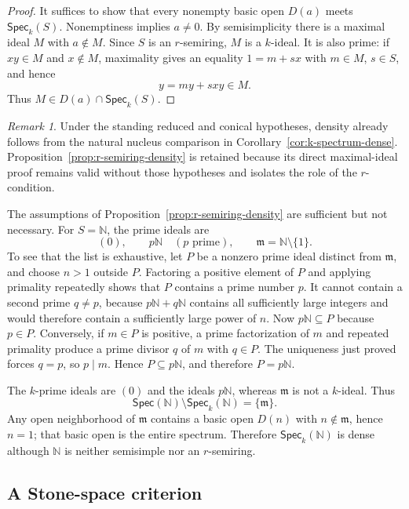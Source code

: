 \documentclass[12pt,leqno]{amsart}
\newcommand{\Spec}{\mathsf{Spec}}
\newcommand{\Speck}{\mathsf{Spec}_{k}}
\theoremstyle{definition}
\numberwithin{equation}{section}
\theoremstyle{remark}
\newtheorem{remark}[theorem]{Remark}
\begin{document}
\begin{proof}
It suffices to show that every nonempty basic open \(D(a)\) meets \(\Speck(S)\). Nonemptiness implies \(a\neq0\). By semisimplicity there is a maximal ideal $M$ with \(a\notin M\). Since $S$ is an $r$-semiring, $M$ is a $k$-ideal. It is also prime: if \(xy\in M\) and \(x\notin M\), maximality gives an equality
\(1=m+sx\) with \(m\in M\), \(s\in S\), and hence
\[
y=my+sxy\in M.
\]
Thus \(M\in D(a)\cap\Speck(S)\).
\end{proof}

\begin{remark}
Under the standing reduced and conical hypotheses, density already follows from the natural nucleus comparison in Corollary~\ref{cor:k-spectrum-dense}. Proposition~\ref{prop:r-semiring-density} is retained because its direct maximal-ideal proof remains valid without those hypotheses and isolates the role of the $r$-condition.

The assumptions of Proposition~\ref{prop:r-semiring-density} are sufficient but not necessary. For \(S=\mathds{N}\), the prime ideals are
\[
(0),
\qquad
p\mathds{N}\quad(p\text{ prime}),
\qquad
\mathfrak m=\mathds{N}\setminus\{1\}.
\]
To see that the list is exhaustive, let $P$ be a nonzero prime ideal distinct from \(\mathfrak m\), and choose \(n>1\) outside $P$. Factoring a positive element of $P$ and applying primality repeatedly shows that $P$ contains a prime number $p$. It cannot contain a second prime \(q\neq p\), because \(p\mathds{N}+q\mathds{N}\) contains all sufficiently large integers and would therefore contain a sufficiently large power of $n$. Now \(p\mathds{N}\subseteq P\) because $p\in P$. Conversely, if $m\in P$ is positive, a prime factorization of $m$ and repeated primality produce a prime divisor $q$ of $m$ with $q\in P$. The uniqueness just proved forces $q=p$, so $p\mid m$. Hence \(P\subseteq p\mathds{N}\), and therefore \(P=p\mathds{N}\).

The $k$-prime ideals are $(0)$ and the ideals \(p\mathds{N}\), whereas \(\mathfrak m\) is not a $k$-ideal. Thus
\[
\Spec(\mathds{N})\setminus\Speck(\mathds{N})=\{\mathfrak m\}.
\]
Any open neighborhood of \(\mathfrak m\) contains a basic open \(D(n)\) with \(n\notin\mathfrak m\), hence \(n=1\); that basic open is the entire spectrum. Therefore \(\Speck(\mathds{N})\) is dense although \(\mathds{N}\) is neither semisimple nor an $r$-semiring.
\end{remark}

\subsection{A Stone-space criterion}
\end{document}
